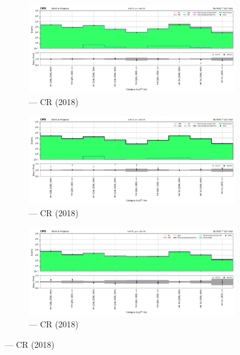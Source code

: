 \begin{figure}[htbp]
    \centering
    \begin{subfigure}[b]{0.66\textwidth}
        \includegraphics[width=\textwidth]{chapters/higgstoinv/figures/mountain_ranges/2018/VH/Wmunu_tree_fit_s-abs_values_VH_cats.pdf}
        \caption{\VH --- \singleMuCr \gls{CR} (2018)}
    \end{subfigure}

    \begin{subfigure}[b]{0.66\textwidth}
        \includegraphics[width=\textwidth]{chapters/higgstoinv/figures/mountain_ranges/2018/VH/Wenu_tree_fit_s-abs_values_VH_cats.pdf}
        \caption{\VH --- \singleEleCr \gls{CR} (2018)}
    \end{subfigure}

    \begin{subfigure}[b]{0.66\textwidth}
        \includegraphics[width=\textwidth]{chapters/higgstoinv/figures/mountain_ranges/2018/VH/Zmumu_tree_fit_s-abs_values_VH_cats.pdf}
        \caption{\VH --- \doubleMuCr \gls{CR} (2018)}
    \end{subfigure}


\end{figure}
